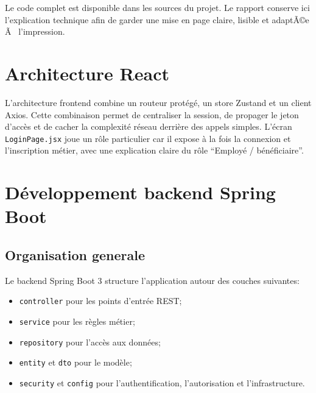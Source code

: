 ﻿\documentclass[12pt,a4paper,oneside]{report}
\newenvironment{codeblock}[1][]{
  \par
  \captionsetup{type=figure}
}{
  \par
}
\begin{document}
\begin{codeblock}[H]
\caption{Implémentation de la page Dashboard en React}
\begin{keybox}
Le code complet est disponible dans les sources du projet. Le rapport conserve ici l'explication technique afin de garder une mise en page claire, lisible et adaptÃ©e Ã  l'impression.
\end{keybox}
\end{codeblock}

\section{Architecture React}
L'architecture frontend combine un routeur protégé, un store Zustand et un client Axios. Cette combinaison permet de centraliser la session, de propager le jeton d'accès et de cacher la complexité réseau derrière des appels simples. L'écran \texttt{LoginPage.jsx} joue un rôle particulier car il expose à la fois la connexion et l'inscription métier, avec une explication claire du rôle \enquote{Employé / bénéficiaire}.

\section{Développement backend Spring Boot}
\subsection{Organisation generale}
Le backend Spring Boot 3 structure l'application autour des couches suivantes:
\begin{itemize}
  \item \texttt{controller} pour les points d'entrée REST;
  \item \texttt{service} pour les règles métier;
  \item \texttt{repository} pour l'accès aux données;
  \item \texttt{entity} et \texttt{dto} pour le modèle;
  \item \texttt{security} et \texttt{config} pour l'authentification, l'autorisation et l'infrastructure.
\end{itemize}
\end{document}
